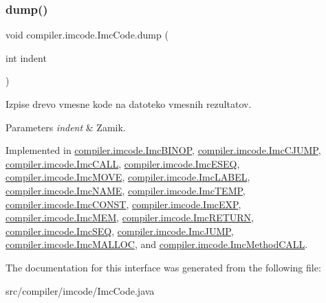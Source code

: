 \subsubsection{\texorpdfstring{dump()}{dump()}}
{\footnotesize\ttfamily void compiler.\+imcode.\+Imc\+Code.\+dump (\begin{DoxyParamCaption}\item[{int}]{indent }\end{DoxyParamCaption})}

Izpise drevo vmesne kode na datoteko vmesnih rezultatov.


\begin{DoxyParams}{Parameters}
{\em indent} & Zamik. \\
\hline
\end{DoxyParams}


Implemented in \hyperlink{classcompiler_1_1imcode_1_1_imc_b_i_n_o_p_a9de35f92c54a54c94d93b46b94ea4086}{compiler.\+imcode.\+Imc\+B\+I\+N\+OP}, \hyperlink{classcompiler_1_1imcode_1_1_imc_c_j_u_m_p_a6930d2d0a3732f608226b60579384b4e}{compiler.\+imcode.\+Imc\+C\+J\+U\+MP}, \hyperlink{classcompiler_1_1imcode_1_1_imc_c_a_l_l_a9cbde704450bc77440e999be90f11de1}{compiler.\+imcode.\+Imc\+C\+A\+LL}, \hyperlink{classcompiler_1_1imcode_1_1_imc_e_s_e_q_ae7ffd559e60c89d8e1d39cd0bab8df66}{compiler.\+imcode.\+Imc\+E\+S\+EQ}, \hyperlink{classcompiler_1_1imcode_1_1_imc_m_o_v_e_a3ffea72b3490bb79245f8c9a311cd4e4}{compiler.\+imcode.\+Imc\+M\+O\+VE}, \hyperlink{classcompiler_1_1imcode_1_1_imc_l_a_b_e_l_a69b88217423419c1c8ba9f2bd7bb3e8f}{compiler.\+imcode.\+Imc\+L\+A\+B\+EL}, \hyperlink{classcompiler_1_1imcode_1_1_imc_n_a_m_e_a3d2c4a326360dea3acbfa30611b66f9e}{compiler.\+imcode.\+Imc\+N\+A\+ME}, \hyperlink{classcompiler_1_1imcode_1_1_imc_t_e_m_p_a82939878ffb278c30d503b0d775626bd}{compiler.\+imcode.\+Imc\+T\+E\+MP}, \hyperlink{classcompiler_1_1imcode_1_1_imc_c_o_n_s_t_a8b39fe0c0fc23dd55e8a1b0d61a7c97d}{compiler.\+imcode.\+Imc\+C\+O\+N\+ST}, \hyperlink{classcompiler_1_1imcode_1_1_imc_e_x_p_a7ad240b5522d827818a746023afd42ee}{compiler.\+imcode.\+Imc\+E\+XP}, \hyperlink{classcompiler_1_1imcode_1_1_imc_m_e_m_a74d96d8a02c82c7d2aa8e2b965d5e557}{compiler.\+imcode.\+Imc\+M\+EM}, \hyperlink{classcompiler_1_1imcode_1_1_imc_r_e_t_u_r_n_a35700088e7645e1162a98266b2de433a}{compiler.\+imcode.\+Imc\+R\+E\+T\+U\+RN}, \hyperlink{classcompiler_1_1imcode_1_1_imc_s_e_q_af5e7a76365d325473814eca4544cf8d2}{compiler.\+imcode.\+Imc\+S\+EQ}, \hyperlink{classcompiler_1_1imcode_1_1_imc_j_u_m_p_ad53ded13619238b0fb2696a4aade579f}{compiler.\+imcode.\+Imc\+J\+U\+MP}, \hyperlink{classcompiler_1_1imcode_1_1_imc_m_a_l_l_o_c_a6785f2c557644c1c09d834226ed22c1d}{compiler.\+imcode.\+Imc\+M\+A\+L\+L\+OC}, and \hyperlink{classcompiler_1_1imcode_1_1_imc_method_c_a_l_l_a43e53dfa27eb848d9168b20e9e0bd972}{compiler.\+imcode.\+Imc\+Method\+C\+A\+LL}.



The documentation for this interface was generated from the following file\+:\begin{DoxyCompactItemize}
\item 
src/compiler/imcode/Imc\+Code.\+java\end{DoxyCompactItemize}
